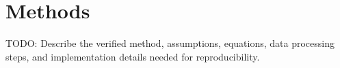 \section{Methods}

TODO: Describe the verified method, assumptions, equations, data processing steps, and implementation details needed for reproducibility.

